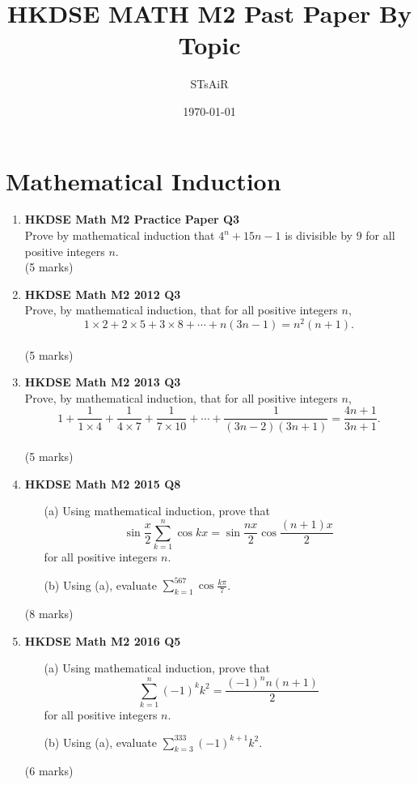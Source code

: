 \documentclass{report}
\title{\bf HKDSE MATH M2 Past Paper By Topic}
\author{STsAiR}
\date{\today}
\begin{document}
\maketitle
\tableofcontents
\chapter{Mathematical Induction}
\begin{enumerate}
	\item \textbf{HKDSE Math M2 Practice Paper Q3}\\
	Prove by mathematical induction that $4^n+15n - 1$ is divisible by 9 for all positive integers $n$. \\(5 marks)

	\item \textbf{HKDSE Math M2 2012 Q3}\\
	Prove, by mathematical induction, that for all positive integers $n$,$$\displaystyle 1 \times 2 + 2 \times 5 + 3 \times 8 + \cdots + n(3n-1) = n^2(n+1).$$ \\(5 marks)

	\item \textbf{HKDSE Math M2 2013 Q3}\\
	Prove, by mathematical induction, that for all positive integers $n$, $$\displaystyle 1 + \frac{1}{1 \times 4} + \frac{1}{4 \times 7} + \frac{1}{7 \times 10} + \cdots + \frac{1}{(3n-2)(3n+1)} = \frac{4n+1}{3n+1}.$$ \\(5 marks)

	\item \textbf{HKDSE Math M2 2015 Q8}
	\begin{enumerate}
		\item [(a)]Using mathematical induction, prove that $$\sin{\displaystyle\frac{x}{2}} \displaystyle\sum_{k = 1}^{n}\cos{kx} = \sin{\displaystyle\frac{nx}{2}}\cos{\displaystyle\frac{(n+1)x}{2}}$$ for all positive integers $n$.
		\item [(b)]Using (a), evaluate $\displaystyle\sum_{k = 1}^{567}\cos{\displaystyle\frac{k\pi}{7}}$.
	\end{enumerate}
	(8 marks)

	\item \textbf{HKDSE Math M2 2016 Q5}
	\begin{enumerate}
		\item [(a)]Using mathematical induction, prove that $$\displaystyle\sum_{k=1}^{n} (-1)^k k^2 = \frac{(-1)^n n(n+1)}{2}$$ for all positive integers $n$. 
		\item [(b)]Using (a), evaluate $\displaystyle\sum_{k=3}^{333} (-1)^{k+1} k^2$.
	\end{enumerate}
	(6 marks)


\end{enumerate}
\end{document}

